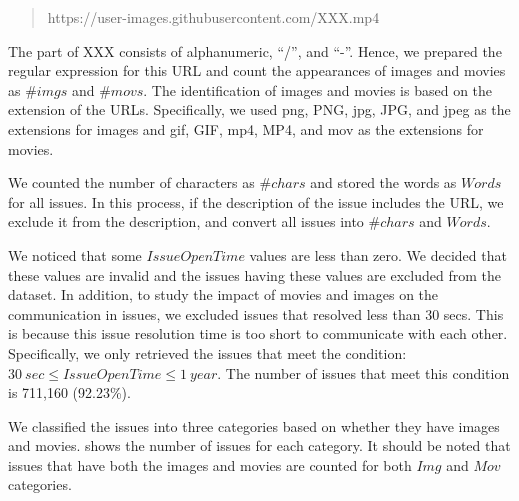 \begin{quote}
	https://user-images.githubusercontent.com/XXX.mp4
\end{quote}

\noindent{}
The part of XXX consists of alphanumeric, ``/'', and ``-''.
Hence, we prepared the regular expression for this URL and 
count the appearances of images and movies as $\#imgs$ and $\#movs$. 
The identification of images and movies is based on the extension of 
the URLs. 
Specifically, we used png, PNG, jpg, JPG, and jpeg as 
the extensions for images and 
gif, GIF, mp4, MP4, and mov as the extensions for movies.

We counted the number of characters as $\#chars$ and 
stored the words as $Words$ for all issues. 
In this process, if the description of the issue 
includes the URL, we exclude it from the description, 
and convert all issues into $\#chars$ and $Words$.

We noticed that some $IssueOpenTime$ values are less than zero. 
We decided that these values are invalid and the issues having 
these values are excluded from the dataset. 
In addition, to study the impact of movies and images on 
the communication in issues, 
we excluded issues that resolved less than 30 secs. 
This is because this issue resolution time is too short 
to communicate with each other. 
Specifically, we only retrieved the issues that meet 
the condition: $30\ sec \leq IssueOpenTime \leq 1\ year$.
The number of issues that meet this condition is 711,160 (92.23\%).



We classified the issues into three categories based on 
whether they have images and movies. 
 shows the number of issues for each category. 
It should be noted that issues that have both 
the images and movies are counted for both 
$Img$ and $Mov$ categories. 

% 
